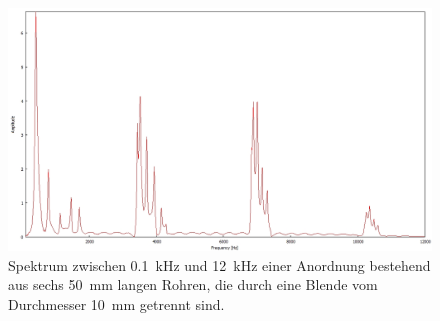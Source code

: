 \begin{figure}
\centering
\includegraphics[width=\textwidth]{content/messungen/Chapter4b/4b_4_6_10.jpg}
\caption{Spektrum zwischen 0.1~kHz und 12~kHz einer Anordnung bestehend aus sechs 50~mm langen Rohren, die durch eine Blende vom Durchmesser 10~mm getrennt sind.}
\label{fig:4b_4_6_16}
\end{figure}
\FloatBarrier
